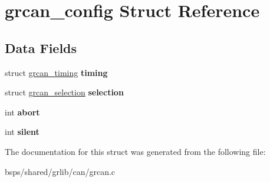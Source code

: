 \hypertarget{structgrcan__config}{}\section{grcan\+\_\+config Struct Reference}
\label{structgrcan__config}
\subsection*{Data Fields}
\begin{DoxyCompactItemize}
\item 
\mbox{\label{structgrcan__config_aa181540e06b3f2359972c619e392a952}} 
struct \mbox{\hyperlink{structgrcan__timing}{grcan\+\_\+timing}} {\bfseries timing}
\item 
\mbox{\label{structgrcan__config_a21e49ddfa29437c7a04c20b73225b74d}} 
struct \mbox{\hyperlink{structgrcan__selection}{grcan\+\_\+selection}} {\bfseries selection}
\item 
\mbox{\label{structgrcan__config_ad9525c16f5863ae0403bc6a749ab9df9}} 
int {\bfseries abort}
\item 
\mbox{\label{structgrcan__config_a31cb44fcc7ca611e2c8e57de57a1d306}} 
int {\bfseries silent}
\end{DoxyCompactItemize}


The documentation for this struct was generated from the following file\+:\begin{DoxyCompactItemize}
\item 
bsps/shared/grlib/can/grcan.\+c\end{DoxyCompactItemize}
